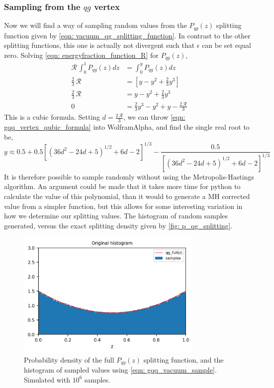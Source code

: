 \documentclass[main.tex]{subfiles}
\begin{document}
\subsubsection*{Sampling from the \(qg\) vertex}
Now we will find a way of sampling random values from the \(P_{qg}(z)\) splitting function given by \autoref{eqn: vacuum_qg_splitting_function}. In contrast to the other splitting functions, this one is actually not divergent such that \(\epsilon\) can be set equal zero. Solving \autoref{eqn: energyfraction_function_R} for \(P_{qg}(z)\),
\begin{align}
    \mathcal{R} \,\int_0^1 P_{qg}(z)dz &= \int_0^y P_{qg}(z)dz \nonumber \\
    \frac{2}{3}\,\mathcal{R} &= \left[ y - y^2 + \frac{2}{3} y^3 \right] \nonumber\\
    \frac{2}{3}\,\mathcal{R} &= y - y^2 + \frac{2}{3} y^3 \nonumber \\
    0 &= \frac{2}{3} y^3 - y^2 + y - \frac{2\, \mathcal{R}}{3} \label{eqn: gqq_vertex_qubic_formula}
\end{align}
This is a cubic formula. Setting \(d = \frac{2\, \mathcal{R}}{3} \), we can throw \autoref{eqn: gqq_vertex_qubic_formula} into WolframAlpha, and find the single real root to be,
\begin{equation}\label{eqn: gqq_vacuum_sample}
    y \approx 0.5 + 0.5 \left[(36 d^2 - 24 d + 5)^{1/2} + 6 d - 2\right]^{1/3} - \frac{0.5}{\left[(36 d^2 - 24 d + 5)^{1/2} + 6 d - 2\right]^{1/3}}
\end{equation}
It is therefore possible to sample randomly without using the Metropolis-Hastings algorithm. An argument could be made that it takes more time for python to calculate the value of this polynomial, than it would to generate a MH corrected value from a simpler function, but this allows for some interesting variation in how we determine our splitting values. The histogram of random samples generated, versus the exact splitting density given by \autoref{fig: p_qg_splitting}.
\begin{figure}[htb]
    \centering
    \includegraphics[width=9cm]{pictures/plots/Metropolis-Hastings/MH_vacuum_qg.png}
    \caption{Probability density of the full \(P_{qg}(z)\) splitting function, and the histogram of sampled values using \autoref{eqn: gqq_vacuum_sample}. Simulated with \(10^6\) samples.}
    \label{fig: p_qg_splitting}
\end{figure}
\end{document}
